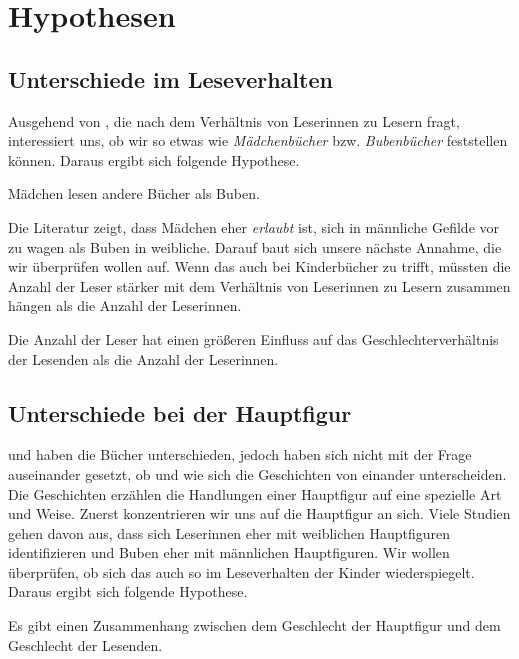 \section{Hypothesen}

\subsection{Unterschiede im Leseverhalten}

Ausgehend von , die nach dem Verhältnis von Leserinnen
zu Lesern fragt, interessiert uns, ob wir so etwas wie
\emph{Mädchenbücher} bzw. \emph{Bubenbücher} feststellen können. Daraus
ergibt sich folgende Hypothese.

\begin{hyp}\label{hyp:andere}
    Mädchen lesen andere Bücher als Buben.
\end{hyp}

Die Literatur zeigt, dass Mädchen eher \emph{erlaubt} ist, sich in
männliche Gefilde vor zu wagen als Buben in weibliche. Darauf baut sich
unsere nächste Annahme, die wir überprüfen wollen auf. Wenn das auch bei
Kinderbücher zu trifft, müssten die Anzahl der Leser stärker mit dem
Verhältnis von Leserinnen zu Lesern zusammen hängen als die Anzahl der
Leserinnen.

\begin{subhyp}\label{hyp:anzahl}
    Die Anzahl der Leser hat einen größeren Einfluss auf das Geschlechterverhältnis der Lesenden als die Anzahl der Leserinnen.
\end{subhyp}

\subsection{Unterschiede bei der Hauptfigur}

 und  haben die Bücher
unterschieden, jedoch haben sich nicht mit der Frage auseinander
gesetzt, ob und wie sich die Geschichten von einander unterscheiden. Die
Geschichten erzählen die Handlungen einer Hauptfigur auf eine spezielle
Art und Weise. Zuerst konzentrieren wir uns auf die Hauptfigur an sich.
Viele Studien gehen davon aus, dass sich Leserinnen eher mit weiblichen
Hauptfiguren identifizieren und Buben eher mit männlichen Hauptfiguren.
Wir wollen überprüfen, ob sich das auch so im Leseverhalten der Kinder
wiederspiegelt. Daraus ergibt sich folgende Hypothese.

\begin{hyp}\label{h2}
    Es gibt einen Zusammenhang zwischen dem Geschlecht der Hauptfigur
    und dem Geschlecht der Lesenden.
\end{hyp}

